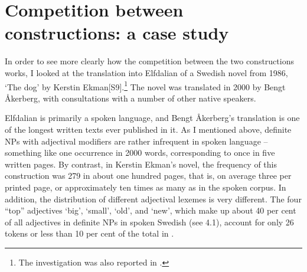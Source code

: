 {%

\ea\label{}
\z
\z 
\section{Competition between constructions: a case study}

In order to see more clearly how the competition between the two constructions works, I looked at the translation into Elfdalian of a Swedish novel from 1986,  ‘The dog’ by Kerstin Ekman[S9].\footnote{ The investigation was also reported in \citet{Dahl2004}.} The novel was translated in 2000 by Bengt Åkerberg, with consultations with a number of other native speakers. 


Elfdalian is primarily a spoken language, and Bengt Åkerberg’s translation is one of the longest written texts ever published in it. As I mentioned above, definite NPs with adjectival modifiers are rather infrequent in spoken language – something like one occurrence in 2000 words, corresponding to once in five written pages. By contrast, in Kerstin Ekman’s novel, the frequency of this construction was 279 in about one hundred pages, that is, on average three per printed page, or approximately ten times as many as in the spoken corpus. In addition, the distribution of different adjectival lexemes is very different. The four “top” adjectives ‘big’,  ‘small’,  ‘old’, and  ‘new’, which make up about 40 per cent of all adjectives in definite NPs in spoken Swedish (see 4.1), account for only 26 tokens or less than 10 per cent of the total in .

}
